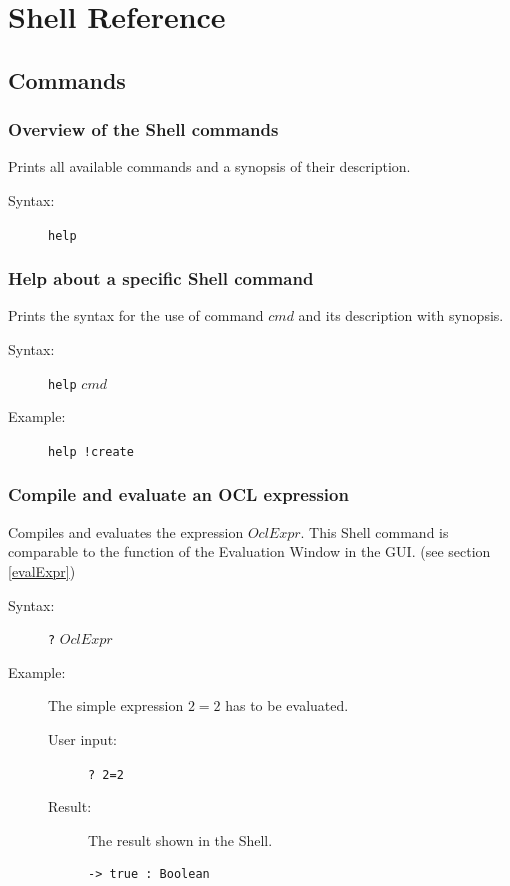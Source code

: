 \documentclass[a4paper,titlepage,oneside,final]{scrreprt} %
\begin{document}
\chapter{Shell Reference}
\section{Commands}\label{ShellCommands}
\subsection{Overview of the Shell commands}
Prints all available commands and a synopsis of their description.
\begin{description}
\item[Syntax:] \verb+help+
\end{description}
\subsection{Help about a specific Shell command}
Prints the syntax for the use of command $\mathit{cmd}$ and its description with synopsis.
\begin{description}
\item[Syntax:] \verb+help+ $\mathit{cmd}$
\item[Example:] \verb+help !create+
\end{description}
\subsection{Compile and evaluate an OCL expression}
Compiles and evaluates the expression $\mathit{OclExpr}$. This Shell command
is comparable to the function of the Evaluation Window in the GUI. (see section \ref{evalExpr})
\begin{description}
\item[Syntax:] \verb+?+ $\mathit{OclExpr}$
\item[Example:] The simple expression $2=2$ has to be evaluated.
\begin{description}
\item[User input:]\verb+? 2=2+
\item[Result:] The result shown in the Shell.
\begin{verbatim}
-> true : Boolean
\end{verbatim}
\end{description}
\end{description}
\end{document}
